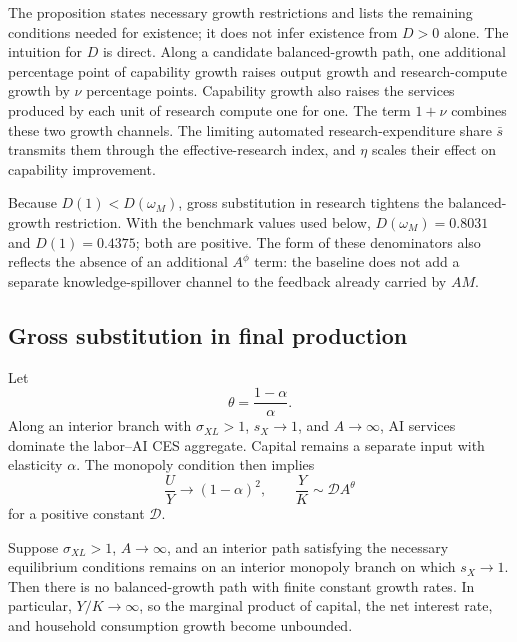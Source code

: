 The proposition states necessary growth restrictions and lists the remaining
conditions needed for existence; it does not infer existence from \(D>0\) alone.
The intuition for \(D\) is direct. Along a candidate balanced-growth path, one
additional percentage point of capability growth raises output growth and
research-compute growth by \(\nu\) percentage points. Capability growth also
raises the services produced by each unit of research compute one for one. The
term \(1+\nu\) combines these two growth channels. The limiting automated
research-expenditure share \(\bar s\) transmits them through the
effective-research index, and \(\eta\)
scales their effect on capability improvement.

Because \(D(1)<D(\omega_M)\), gross substitution in research tightens the
balanced-growth restriction. With the benchmark values used below,
\(D(\omega_M)=0.8031\) and \(D(1)=0.4375\); both are positive. The form of these
denominators also reflects the absence of an additional \(A^\phi\) term: the
baseline does not add a separate knowledge-spillover channel to the feedback
already carried by \(AM\).

\subsection{Gross substitution in final production}

Let
\begin{equation}
 \theta=\frac{1-\alpha}{\alpha}.
 \label{eq:axm-theta}
\end{equation}
Along an interior branch with \(\sigma_{XL}>1\), \(s_X\to1\), and
\(A\to\infty\), AI services dominate the labor--AI CES aggregate. Capital
remains a separate input with elasticity \(\alpha\). The monopoly condition then
implies
\begin{equation}
 \frac{U}{Y}\to(1-\alpha)^2,\qquad
 \frac{Y}{K}\sim \mathcal D A^\theta
 \label{eq:axm-high-sigma-scaling}
\end{equation}
for a positive constant \(\mathcal D\).

\begin{proposition}
\label{prop:axm-no-bgp}
Suppose \(\sigma_{XL}>1\), \(A\to\infty\), and an interior path satisfying the
necessary equilibrium conditions remains on an
interior monopoly branch on which \(s_X\to1\). Then there is no balanced-growth
path with finite constant growth rates. In particular, \(Y/K\to\infty\), so the marginal
product of capital, the net interest rate, and household consumption growth
become unbounded.
\end{proposition}

